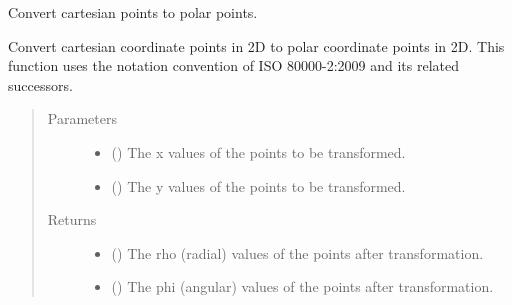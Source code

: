 \documentclass[letterpaper,10pt,english]{sphinxmanual}
\begin{document}

\begin{fulllineitems}
\label{\detokenize{Backend.coordinate_system_transformation:Backend.coordinate_system_transformation.cartesian_to_polar_2d}}
Convert cartesian points to polar points.

Convert cartesian coordinate points in 2D to polar coordinate points in 2D.
This function uses the notation convention of ISO 80000-2:2009 and its
related successors.
\begin{quote}\begin{description}
\item[{Parameters}] \leavevmode\begin{itemize}
\item {} 
 () \textendash{} The x values of the points to be transformed.

\item {} 
 () \textendash{} The y values of the points to be transformed.

\end{itemize}

\item[{Returns}] \leavevmode
\begin{itemize}
\item {} 
 () \textendash{} The rho (radial) values of the points after transformation.

\item {} 
 () \textendash{} The phi (angular) values of the points after transformation.

\end{itemize}


\end{description}\end{quote}

\end{fulllineitems}

\end{document}
